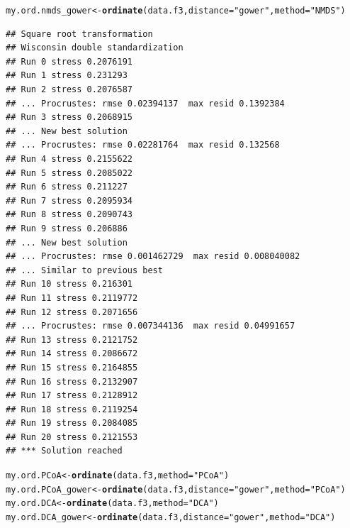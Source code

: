 \documentclass[12pt]{article}\usepackage[]{graphicx}\usepackage[]{color}
\makeatletter
\newcommand{\hlstr}[1]{\textcolor[rgb]{0.192,0.494,0.8}{#1}}%
\newcommand{\hlstd}[1]{\textcolor[rgb]{0.345,0.345,0.345}{#1}}%
\newcommand{\hlkwb}[1]{\textcolor[rgb]{0.69,0.353,0.396}{#1}}%
\newcommand{\hlkwc}[1]{\textcolor[rgb]{0.333,0.667,0.333}{#1}}%
\newcommand{\hlkwd}[1]{\textcolor[rgb]{0.737,0.353,0.396}{\textbf{#1}}}%
\newenvironment{kframe}{%
 \def\at@end@of@kframe{}%
 \ifinner\ifhmode%
  \def\at@end@of@kframe{\end{minipage}}%
  \begin{minipage}{\columnwidth}%
 \fi\fi%
 \def\FrameCommand##1{\hskip\@totalleftmargin \hskip-\fboxsep
 \colorbox{shadecolor}{##1}\hskip-\fboxsep
     \hskip-\linewidth \hskip-\@totalleftmargin \hskip\columnwidth}%
 \MakeFramed {\advance\hsize-\width
   \@totalleftmargin\z@ \linewidth\hsize
   \@setminipage}}%
 {\par\unskip\endMakeFramed%
 \at@end@of@kframe}
\newenvironment{knitrout}{}{} %
\numberwithin{figure}{section}
\makeatother
\begin{document}
\begin{knitrout}\small
{}\color{fgcolor}\begin{kframe}
\begin{alltt}
\hlstd{my.ord.nmds_gower} \hlkwb{<-} \hlkwd{ordinate}\hlstd{(data.f3,} \hlkwc{distance} \hlstd{=} \hlstr{"gower"}\hlstd{,}  \hlkwc{method} \hlstd{=} \hlstr{"NMDS"}\hlstd{)}
\end{alltt}
\begin{verbatim}
## Square root transformation
## Wisconsin double standardization
## Run 0 stress 0.2076191 
## Run 1 stress 0.231293 
## Run 2 stress 0.2076587 
## ... Procrustes: rmse 0.02394137  max resid 0.1392384 
## Run 3 stress 0.2068915 
## ... New best solution
## ... Procrustes: rmse 0.02281764  max resid 0.132568 
## Run 4 stress 0.2155622 
## Run 5 stress 0.2085022 
## Run 6 stress 0.211227 
## Run 7 stress 0.2095934 
## Run 8 stress 0.2090743 
## Run 9 stress 0.206886 
## ... New best solution
## ... Procrustes: rmse 0.001462729  max resid 0.008040082 
## ... Similar to previous best
## Run 10 stress 0.216301 
## Run 11 stress 0.2119772 
## Run 12 stress 0.2071656 
## ... Procrustes: rmse 0.007344136  max resid 0.04991657 
## Run 13 stress 0.2121752 
## Run 14 stress 0.2086672 
## Run 15 stress 0.2164855 
## Run 16 stress 0.2132907 
## Run 17 stress 0.2128912 
## Run 18 stress 0.2119254 
## Run 19 stress 0.2084085 
## Run 20 stress 0.2121553 
## *** Solution reached
\end{verbatim}
\begin{alltt}
\hlstd{my.ord.PCoA} \hlkwb{<-} \hlkwd{ordinate}\hlstd{(data.f3,} \hlkwc{method} \hlstd{=} \hlstr{"PCoA"}\hlstd{)}
\hlstd{my.ord.PCoA_gower} \hlkwb{<-} \hlkwd{ordinate}\hlstd{(data.f3,} \hlkwc{distance} \hlstd{=} \hlstr{"gower"}\hlstd{,} \hlkwc{method} \hlstd{=} \hlstr{"PCoA"}\hlstd{)}
\hlstd{my.ord.DCA} \hlkwb{<-} \hlkwd{ordinate}\hlstd{(data.f3,} \hlkwc{method} \hlstd{=} \hlstr{"DCA"}\hlstd{)}
\hlstd{my.ord.DCA_gower} \hlkwb{<-} \hlkwd{ordinate}\hlstd{(data.f3,} \hlkwc{distance} \hlstd{=} \hlstr{"gower"}\hlstd{,} \hlkwc{method} \hlstd{=} \hlstr{"DCA"}\hlstd{)}


\end{alltt}
\end{kframe}
\end{knitrout}
\end{document}
